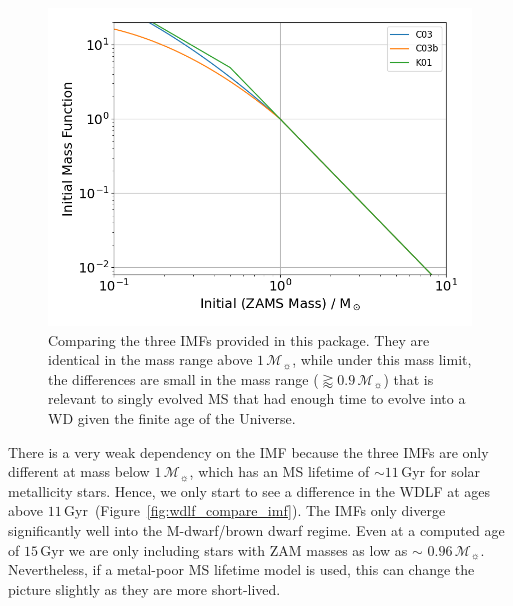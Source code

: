 \documentclass[fleqn,usenatbib]{rasti}
\newcommand{\msun}{\mathcal{M}_{\sun}}
\begin{document}
\begin{figure}
    \centering
    \includegraphics[width=\columnwidth]{fig_05_imfs.png}
    \caption{Comparing the three IMFs provided in this package. They are
    identical in the mass range above $1\,\msun$, while under this mass
    limit, the differences are small in the mass range ($\gtrapprox0.9\,\msun$)
    that is relevant to singly evolved MS that had enough time to evolve into a
    WD given the finite age of the Universe.}
    \label{fig:imfs}
\end{figure}

There is a very weak dependency on the IMF because the three IMFs are only
different at mass below $1\,\msun$, which has an MS lifetime of
$\sim11$\,Gyr for solar metallicity stars. Hence, we only
start to see a difference in the WDLF at ages above
$11$\,Gyr~(Figure~\ref{fig:wdlf_compare_imf}). The IMFs only diverge
significantly well into the M-dwarf/brown dwarf
regime. Even at a computed age of $15$\,Gyr
we are only including stars with ZAM masses as low as $\sim$ $0.96\,\msun$.
Nevertheless, if a metal-poor MS lifetime model is used, this can change the
picture slightly as they are more short-lived.
\end{document}
